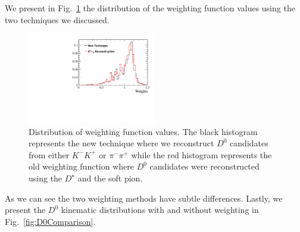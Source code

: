 \documentclass{article}
\begin{document}
        We present  in Fig.~\ref{fig:weightsBeforeAfter} the distribution of the weighting function values using the two techniques we discussed.
        \begin{figure}[h!]
                \centering
                \includegraphics[width = 0.5\textwidth]{../work/RapidSimAnalysis/NewWeightingFunction/Plots/WeighsBeforeAfter.pdf}
                \caption{Distribution of weighting function values.
                The black histogram represents the new technique where we reconstruct $D^0$ candidates from either $K^-K^+$ or $\pi^-\pi^+$ while the red histogram represents the old weighting function where $D^0$ candidates were reconstructed using the $D^\star$ and the soft pion.}
                \label{fig:weightsBeforeAfter}
        \end{figure}
        As we can see the two weighting methods have subtle differences.
        Lastly, we present the $D^0$ kinematic distributions with and without weighting in Fig.~\ref{fig:D0Comparison}.
\end{document}
